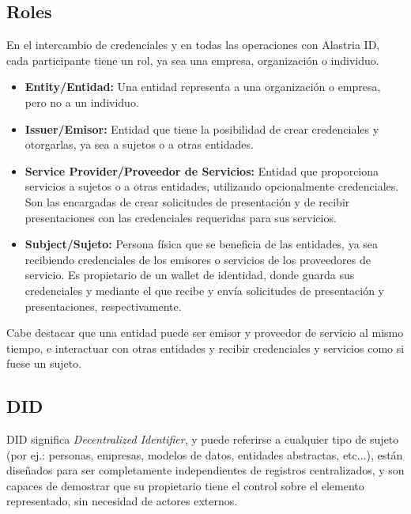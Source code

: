 \subsection{Roles}
En el intercambio de credenciales y en todas las operaciones con Alastria ID, cada participante tiene un rol, ya sea una empresa, organización o individuo.
\begin{itemize}
    \item \textbf{Entity/Entidad:} Una entidad representa a una organización o empresa, pero no a un individuo.
    \item \textbf{Issuer/Emisor:} Entidad que tiene la posibilidad de crear credenciales y otorgarlas, ya sea a sujetos o a otras entidades. 
    \item \textbf{Service Provider/Proveedor de Servicios:} Entidad que proporciona servicios a sujetos o a otras entidades, utilizando opcionalmente credenciales. Son las encargadas de crear solicitudes de presentación y de recibir presentaciones con las credenciales requeridas para sus servicios.
    \item \textbf{Subject/Sujeto:} Persona física que se beneficia de las entidades, ya sea recibiendo credenciales de los emisores o servicios de los proveedores de servicio. Es propietario de un wallet de identidad, donde guarda sus credenciales y mediante el que recibe y envía solicitudes de presentación y presentaciones, respectivamente.
\end{itemize}
Cabe destacar que una entidad puede ser emisor y proveedor de servicio al mismo tiempo, e interactuar con otras entidades y recibir credenciales y servicios como si fuese un sujeto.
\subsection{DID}
DID significa \textit{Decentralized Identifier}, y puede referirse a cualquier tipo de sujeto (por ej.: personas, empresas, modelos de datos, entidades abstractas, etc...), están diseñados para ser completamente independientes de registros centralizados, y son capaces de demostrar que su propietario tiene el control sobre el elemento representado, sin necesidad de actores externos.

